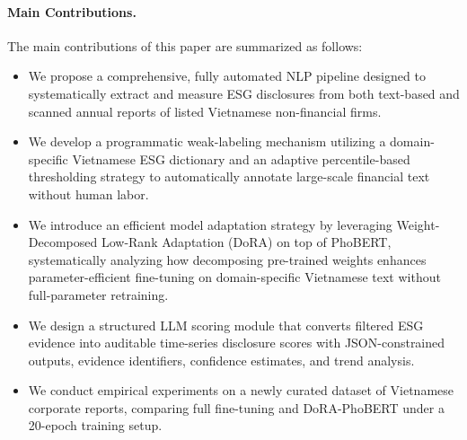 \documentclass{article}
\newcommand{\method}{\textsc{MethodName}}
\newcommand{\todoinline}[1]{\textcolor{red}{[TODO: #1]}}
\theoremstyle{plain}
\theoremstyle{definition}
\theoremstyle{remark}
\begin{document}
\paragraph{Main Contributions.}
The main contributions of this paper are summarized as follows:
\begin{itemize}
    \item We propose a comprehensive, fully automated NLP pipeline designed to systematically extract and measure ESG disclosures from both text-based and scanned annual reports of listed Vietnamese non-financial firms.
    \item We develop a programmatic weak-labeling mechanism utilizing a domain-specific Vietnamese ESG dictionary and an adaptive percentile-based thresholding strategy to automatically annotate large-scale financial text without human labor.
    \item We introduce an efficient model adaptation strategy by leveraging Weight-Decomposed Low-Rank Adaptation (DoRA) on top of PhoBERT, systematically analyzing how decomposing pre-trained weights enhances parameter-efficient fine-tuning on domain-specific Vietnamese text without full-parameter retraining.
    \item We design a structured LLM scoring module that converts filtered ESG evidence into auditable time-series disclosure scores with JSON-constrained outputs, evidence identifiers, confidence estimates, and trend analysis.
    \item We conduct empirical experiments on a newly curated dataset of Vietnamese corporate reports, comparing full fine-tuning and DoRA-PhoBERT under a 20-epoch training setup.
\end{itemize}
\end{document}
